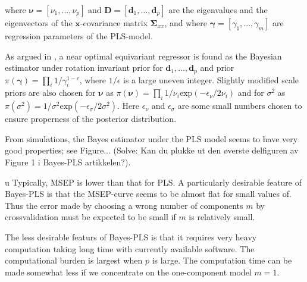 \documentclass[a4paper, 11pt]{article}
\begin{document}
where $\bm{\nu}=[\nu_1,...,\nu_p]$ and $\bm{D}=[\bm{d}_1,...,\bm{d}_p]$ are the eigenvalues and the eigenvectors of the $\bm{x}$-covariance matrix $\bm{\Sigma}_{xx}$, and where $\bm{\gamma}=[\gamma_1,...,\gamma_m]$ are regression parameters of the PLS-model.

As argued in \citet{helland2012near}, a near optimal equivariant regressor is
found as the Bayesian estimator under rotation invariant prior for
$\bm{d}_1,...,\bm{d}_p$ and prior $\pi(\bm{\gamma})=\prod_i
1/\gamma_i^{1-\epsilon}$, where $1/\epsilon$ is a large uneven integer. Slightly
modified scale priors are also chosen for $\bm{\nu}$ as $\pi(\bm{\nu}) =\prod_i
1/\nu_i \mathrm{exp}(-\epsilon_\nu/2\nu_i)$ and for $\sigma^2$ as$ \pi(\sigma^2)=1/\sigma^2\mathrm{exp}(-\epsilon_\sigma/2\sigma^2)$. Here $\epsilon_\nu$ and $\epsilon_\sigma$ are some small numbers chosen to ensure properness of the posterior distribution.

From simulations, the Bayes estimator under the PLS model seems to have very good properties; see Figure... (Solve: Kan du plukke ut den \o verste delfiguren av Figure 1 i Bayes-PLS artikkelen?).


u Typically, MSEP is lower than that for PLS. A particularly desirable feature of Bayes-PLS is that the MSEP-curve seems to be almost flat for small values of. Thus the error made by choosing a wrong number of components $m$ by crossvalidation must be expected to be small if $m$ is relatively small.

The less desirable featurs of Bayes-PLS is that it requires very heavy computation taking long time with currently available software. The computational burden is largest when $p$ is large. The computation time can be made somewhat  less if we concentrate on the one-component model $m=1$.
\end{document}

